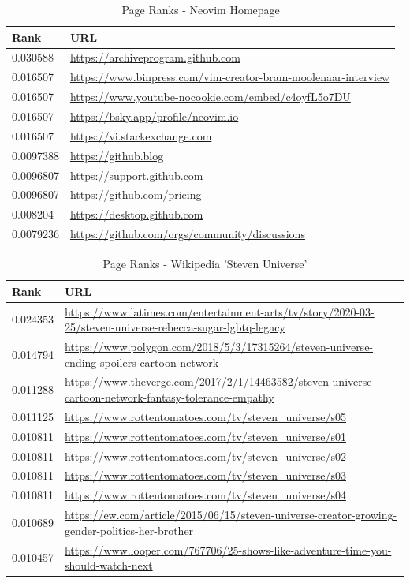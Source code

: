 \documentclass[unicode,11pt,a4paper,oneside,numbers=endperiod,openany]{scrartcl}
\begin{document}
{
\hypersetup{hidelinks}
\begin{table}[h]
    \centering
    \begin{tabular}{lp{12cm}}
        \toprule
        \textbf{Rank} & \textbf{URL} \\
        \midrule
        0.030588 & \url{https://archiveprogram.github.com} \\
        0.016507 & \url{https://www.binpress.com/vim-creator-bram-moolenaar-interview} \\
        0.016507 & \url{https://www.youtube-nocookie.com/embed/c4oyfL5o7DU} \\
        0.016507 & \url{https://bsky.app/profile/neovim.io} \\
        0.016507 & \url{https://vi.stackexchange.com} \\
        0.0097388 & \url{https://github.blog} \\
        0.0096807 & \url{https://support.github.com} \\
        0.0096807 & \url{https://github.com/pricing} \\
        0.008204 & \url{https://desktop.github.com} \\
        0.0079236 & \url{https://github.com/orgs/community/discussions} \\
        \bottomrule
    \end{tabular}
    \caption{Page Ranks - Neovim Homepage}
\end{table}
\begin{table}[h]
    \centering
    \begin{tabular}{lp{12cm}}
        \toprule
        \textbf{Rank} & \textbf{URL} \\
        \midrule
        0.024353 & \url{https://www.latimes.com/entertainment-arts/tv/story/2020-03-25/steven-universe-rebecca-sugar-lgbtq-legacy} \\
        0.014794 & \url{https://www.polygon.com/2018/5/3/17315264/steven-universe-ending-spoilers-cartoon-network} \\
        0.011288 & \url{https://www.theverge.com/2017/2/1/14463582/steven-universe-cartoon-network-fantasy-tolerance-empathy} \\
        0.011125 & \url{https://www.rottentomatoes.com/tv/steven_universe/s05} \\
        0.010811 & \url{https://www.rottentomatoes.com/tv/steven_universe/s01} \\
        0.010811 & \url{https://www.rottentomatoes.com/tv/steven_universe/s02} \\
        0.010811 & \url{https://www.rottentomatoes.com/tv/steven_universe/s03} \\
        0.010811 & \url{https://www.rottentomatoes.com/tv/steven_universe/s04} \\
        0.010689 & \url{https://ew.com/article/2015/06/15/steven-universe-creator-growing-gender-politics-her-brother} \\
        0.010457 & \url{https://www.looper.com/767706/25-shows-like-adventure-time-you-should-watch-next} \\
        \bottomrule
    \end{tabular}
    \caption{Page Ranks - Wikipedia 'Steven Universe'}
\end{table}
}
\end{document}
